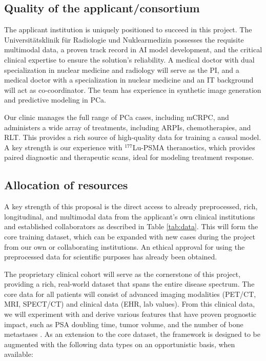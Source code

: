 \documentclass[11pt, a4paper]{article}
\begin{document}
\subsection{Quality of the applicant/consortium}
The applicant institution is uniquely positioned to succeed in this project. The Universitätsklinik für Radiologie und Nuklearmedizin possesses the requisite multimodal data, a proven track record in AI model development, and the critical clinical expertise to ensure the solution's reliability. A medical doctor with dual specialization in nuclear medicine and radiology will serve as the PI, and a medical doctor with a specialization in nuclear medicine and an IT background will act as co-coordinator. The team has experience in synthetic image generation and predictive modeling in PCa.

Our clinic manages the full range of PCa cases, including mCRPC, and administers a wide array of treatments, including ARPIs, chemotherapies, and RLT. This provides a rich source of high-quality data for training a causal model. A key strength is our experience with $^{177}$Lu-PSMA theranostics, which provides paired diagnostic and therapeutic scans, ideal for modeling treatment response.

\subsection{Allocation of resources}
A key strength of this proposal is the direct access to already preprocessed, rich, longitudinal, and multimodal data from the applicant's own clinical institutions and established collaborators as described in Table \ref{tab:data}. This will form the core training dataset, which can be expanded with new cases during the project from our own or collaborating institutions. An ethical approval for using the preprocessed data for scientific purposes has already been obtained.

The proprietary clinical cohort will serve as the cornerstone of this project, providing a rich, real-world dataset that spans the entire disease spectrum. The core data for all patients will consist of advanced imaging modalities (PET/CT, MRI, SPECT/CT) and clinical data (EHR, lab values). From this clinical data, we will experiment with and derive various features that have proven prognostic impact, such as PSA doubling time, tumor volume, and the number of bone metastases \cite{guidelines_uro_1,guidelines_uro_2}. As an extension to the core dataset, the framework is designed to be augmented with the following data types on an opportunistic basis, when available:
\end{document}
